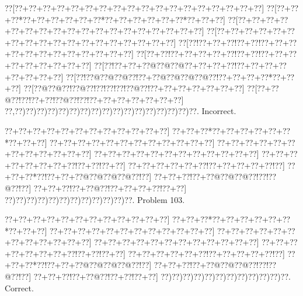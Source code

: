 \documentclass[a5paper]{article}
\begin{document}
\begin{center}
{\goo
\0??[\0??+\0??+\0??+\0??+\0??+\0??+\0??+\0??+\0??+\0??+\0??+\0??+\0??+\0??+\0??+\0??+\0??+\0??]
\0??[\0??+\0??+\0??*\0??+\0??+\0??+\0??+\0??+\0??*\0??+\0??+\0??+\0??+\0??+\0??*\0??+\0??+\0??]
\0??[\0??+\0??+\0??+\0??+\0??+\0??+\0??+\0??+\0??+\0??+\0??+\0??+\0??+\0??+\0??+\0??+\0??+\0??]
\0??[\0??+\0??+\0??+\0??+\0??+\0??+\0??+\0??+\0??+\0??+\0??+\0??+\0??+\0??+\0??+\0??+\0??+\0??]
\0??[\0??!\0??+\0??+\0??!\0??+\0??!\0??+\0??+\0??+\0??+\0??+\0??+\0??+\0??+\0??+\0??+\0??+\0??]
\0??[\0??+\0??!\0??+\0??+\0??+\0??+\0??!\0??+\0??!\0??+\0??+\0??+\0??+\0??+\0??+\0??+\0??+\0??]
\0??[\0??!\0??+\0??+\0??@\0??@\0??@\0??+\0??+\0??+\0??!\0??+\0??+\0??+\0??+\0??+\0??+\0??+\0??]
\0??[\0??!\0??@\0??@\0??@\0??!\0??+\0??@\0??@\0??@\0??@\0??!\0??+\0??+\0??+\0??*\0??+\0??+\0??]
\0??[\0??@\0??@\0??!\0??@\0??!\0??!\0??!\0??!\0??@\0??!\0??+\0??+\0??+\0??+\0??+\0??+\0??]
\0??[\0??+\0??@\0??!\0??!\0??+\0??!\0??@\0??!\0??!\0??+\0??+\0??+\0??+\0??+\0??+\0??]
\0??,\0??)\0??)\0??)\0??)\0??)\0??)\0??)\0??)\0??)\0??)\0??)\0??)\0??)\0??)\0??)\0??)\0??.
}
Incorrect. 

\end{center}
\newpage
\begin{center}
{\goo
\0??+\0??+\0??+\0??+\0??+\0??+\0??+\0??+\0??+\0??+\0??+\0??]
\0??+\0??+\0??*\0??+\0??+\0??+\0??+\0??+\0??*\0??+\0??+\0??]
\0??+\0??+\0??+\0??+\0??+\0??+\0??+\0??+\0??+\0??+\0??+\0??]
\0??+\0??+\0??+\0??+\0??+\0??+\0??+\0??+\0??+\0??+\0??+\0??]
\0??+\0??+\0??+\0??+\0??+\0??+\0??+\0??+\0??+\0??+\0??+\0??]
\0??+\0??+\0??+\0??+\0??+\0??+\0??+\0??!\0??+\0??!\0??+\0??]
\0??+\0??+\0??+\0??+\0??+\0??!\0??+\0??+\0??+\0??+\0??!\0??]
\0??+\0??+\0??*\0??!\0??+\0??+\0??@\0??@\0??@\0??@\0??!\0??]
\0??+\0??+\0??!\0??+\0??@\0??@\0??@\0??!\0??!\0??@\0??!\0??]
\0??+\0??+\0??!\0??+\0??@\0??!\0??+\0??+\0??+\0??!\0??+\0??]
\0??)\0??)\0??)\0??)\0??)\0??)\0??)\0??)\0??)\0??)\0??)\0??.
}
Problem 103.

\end{center}
\begin{center}
{\goo
\0??+\0??+\0??+\0??+\0??+\0??+\0??+\0??+\0??+\0??+\0??+\0??]
\0??+\0??+\0??*\0??+\0??+\0??+\0??+\0??+\0??*\0??+\0??+\0??]
\0??+\0??+\0??+\0??+\0??+\0??+\0??+\0??+\0??+\0??+\0??+\0??]
\0??+\0??+\0??+\0??+\0??+\0??+\0??+\0??+\0??+\0??+\0??+\0??]
\0??+\0??+\0??+\0??+\0??+\0??+\0??+\0??+\0??+\0??+\0??+\0??]
\0??+\0??+\0??+\0??+\0??+\0??+\0??+\0??!\0??+\0??!\0??+\0??]
\0??+\0??+\0??+\0??+\0??+\0??!\0??+\0??+\0??+\0??+\0??!\0??]
\0??+\0??+\0??*\0??!\0??+\0??+\0??@\0??@\0??@\0??@\0??!\0??]
\0??+\0??+\0??!\0??+\0??@\0??@\0??@\0??!\0??!\0??@\0??!\0??]
\0??+\0??+\0??!\0??+\0??@\0??!\0??+\0??!\0??+\0??]
\0??)\0??)\0??)\0??)\0??)\0??)\0??)\0??)\0??)\0??)\0??)\0??.
}
Correct. 

\end{center}
\end{document}
